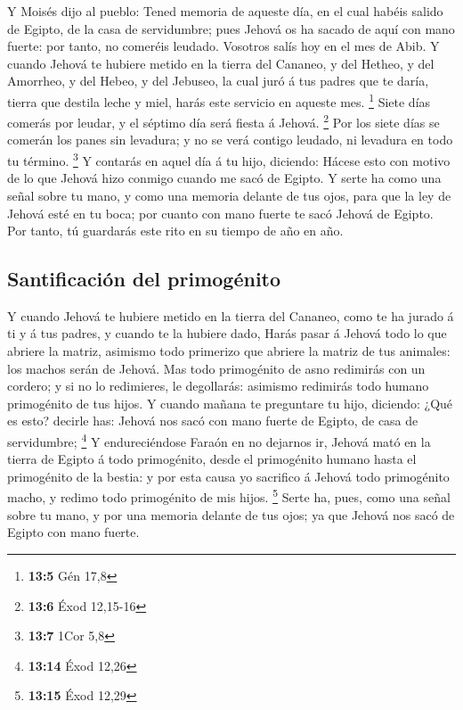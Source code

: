  Y Moisés dijo al pueblo: Tened memoria de aqueste día, en
el cual habéis salido de Egipto, de la casa de servidumbre; pues Jehová
os ha sacado de aquí con mano fuerte: por tanto, no comeréis leudado.
 Vosotros salís hoy en el mes de Abib.  Y cuando
Jehová te hubiere metido en la tierra del Cananeo, y del Hetheo, y del
Amorrheo, y del Hebeo, y del Jebuseo, la cual juró á tus padres que te
daría, tierra que destila leche y miel, harás este servicio en aqueste
mes. \footnote{\textbf{13:5} Gén 17,8}  Siete días comerás
por leudar, y el séptimo día será fiesta á Jehová. \footnote{\textbf{13:6}
  Éxod 12,15-16}  Por los siete días se comerán los panes
sin levadura; y no se verá contigo leudado, ni levadura en todo tu
término. \footnote{\textbf{13:7} 1Cor 5,8}  Y contarás en
aquel día á tu hijo, diciendo: Hácese esto con motivo de lo que Jehová
hizo conmigo cuando me sacó de Egipto.  Y serte ha como una
señal sobre tu mano, y como una memoria delante de tus ojos, para que la
ley de Jehová esté en tu boca; por cuanto con mano fuerte te sacó Jehová
de Egipto.  Por tanto, tú guardarás este rito en su tiempo
de año en año.

\hypertarget{santificaciuxf3n-del-primoguxe9nito}{%
\subsection{Santificación del
primogénito}\label{santificaciuxf3n-del-primoguxe9nito}}

 Y cuando Jehová te hubiere metido en la tierra del
Cananeo, como te ha jurado á ti y á tus padres, y cuando te la hubiere
dado,  Harás pasar á Jehová todo lo que abriere la matriz,
asimismo todo primerizo que abriere la matriz de tus animales: los
machos serán de Jehová.  Mas todo primogénito de asno
redimirás con un cordero; y si no lo redimieres, le degollarás: asimismo
redimirás todo humano primogénito de tus hijos.  Y cuando
mañana te preguntare tu hijo, diciendo: ¿Qué es esto? decirle has:
Jehová nos sacó con mano fuerte de Egipto, de casa de servidumbre;
\footnote{\textbf{13:14} Éxod 12,26}  Y endureciéndose
Faraón en no dejarnos ir, Jehová mató en la tierra de Egipto á todo
primogénito, desde el primogénito humano hasta el primogénito de la
bestia: y por esta causa yo sacrifico á Jehová todo primogénito macho, y
redimo todo primogénito de mis hijos. \footnote{\textbf{13:15} Éxod
  12,29}  Serte ha, pues, como una señal sobre tu mano, y
por una memoria delante de tus ojos; ya que Jehová nos sacó de Egipto
con mano fuerte.

